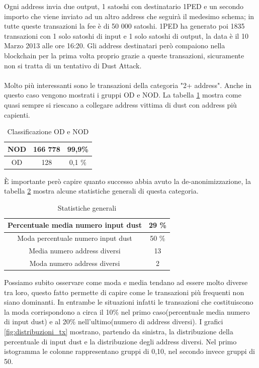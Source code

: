 \FloatBarrier
Ogni address invia due output, 1 satoshi con destinatario 1PED e un secondo importo che viene inviato ad un altro address che seguirà il medesimo schema; in tutte queste transazioni la fee è di 50 000 satoshi. 1PED ha generato poi 1835 transazioni con 1 solo satoshi di input e 1 solo satoshi di output, la data è il 10 Marzo 2013 alle ore 16:20. Gli address destinatari però compaiono nella blockchain per la prima volta proprio grazie a queste transazioni, sicuramente non si tratta di un tentativo di Dust Attack.\\\\
Molto più interessanti sono le transazioni della categoria "2+ address". Anche in questo caso vengono mostrati i gruppi OD e NOD. La tabella \ref{tab:OD_NOD_success} mostra come quasi sempre si riescano a collegare address vittima di dust con address più capienti.
\begin{table}[H]
    \centering
    \begin{tabular}{|c|c|c|}
        \hline
            NOD  & 166 778 & 99,9\%\\
        \hline 
            OD  & 128 & 0,1 \%\\
        \hline
    \end{tabular}
    \caption{Classificazione OD e NOD}
    \label{tab:OD_NOD_success}
\end{table}
È importante però capire quanto successo abbia avuto la de-anonimizzazione, la tabella \ref{tab:stat} mostra alcune statistiche generali di questa categoria. 
\begin{table}[H]
    \centering
    \begin{tabular}{|c|c|}
        \hline
            Percentuale media numero input dust & 29 \%\\
        \hline
            Moda percentuale numero input dust & 50 \%\\ %
        \hline
            Media numero address diversi & 13\\
        \hline
            Moda numero address diversi & 2\\ %
        \hline
    \end{tabular}
    \caption{Statistiche generali}
    \label{tab:stat}
\end{table}
Possiamo subito osservare come moda e media tendano ad essere molto diverse tra loro, questo fatto permette di capire come le transazioni più frequenti non siano dominanti. In entrambe le situazioni infatti le transazioni che costituiscono la moda corrispondono a circa il 10\% nel primo caso(percentuale media numero di input dust) e al 20\% nell'ultimo(numero di address diversi). I grafici \ref{fig:distribuzioni_tx} mostrano, partendo da sinistra, la distribuzione della percentuale di input dust e la distribuzione degli address diversi. Nel primo istogramma le colonne rappresentano gruppi di 0,10, nel secondo invece gruppi di 50.
